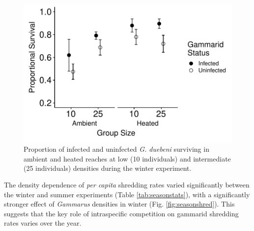 \begin{figure}[H]
    \centering
    \includegraphics[keepaspectratio]{figures/ch5/wintersurvive.pdf}
  \caption [Survival of \emph{G. duebeni} during experiments in ambient and warmed reaches of the River Shannon.]{Proportion of infected and uninfected \emph{G. duebeni} surviving in ambient and heated reaches at low (10 individuals) and intermediate (25 individuals) densities during the winter experiment.} 
    \label{fig:wintersurvive}
\end{figure}

The density dependence of \emph{per capita} shredding rates varied significantly between the winter and summer experiments (Table \ref{tab:seasonstats}), with a significantly stronger effect of \emph{Gammarus} densities in winter (Fig. \ref{fig:seasonshred}). This suggests that the key role of intraspecific competition on gammarid shredding rates varies over the year. 

